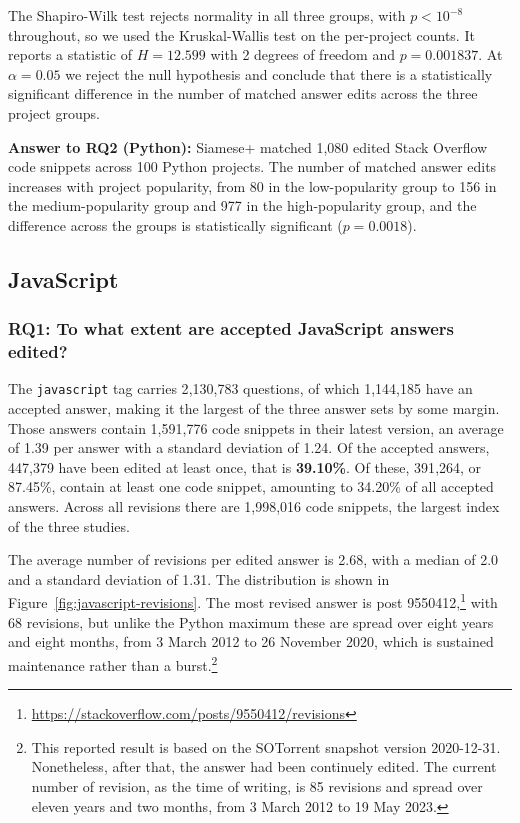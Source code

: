 \documentclass[onecolumn,11pt]{IEEEtran}
\newenvironment{rqanswer}{\par\medskip\begin{framed}\noindent}{\end{framed}\par\medskip}
\begin{document}
The Shapiro-Wilk test rejects normality in all three groups, with $p < 10^{-8}$ throughout, so we used the Kruskal-Wallis test on the per-project counts.
It reports a statistic of $H = 12.599$ with 2 degrees of freedom and $p = 0.001837$.
At $\alpha = 0.05$ we reject the null hypothesis and conclude that there is a statistically significant difference in the number of matched answer edits across the three project groups.

\begin{rqanswer}
\textbf{Answer to RQ2 (Python):} Siamese+ matched 1{,}080 edited Stack Overflow code snippets across 100 Python projects.
The number of matched answer edits increases with project popularity, from 80 in the low-popularity group to 156 in the medium-popularity group and 977 in the high-popularity group, and the difference across the groups is statistically significant ($p = 0.0018$).
\end{rqanswer}

\subsection{JavaScript}
\label{sec:results-javascript}

\subsubsection{RQ1: To what extent are accepted JavaScript answers edited?}

The \texttt{javascript} tag carries 2{,}130{,}783 questions, of which 1{,}144{,}185 have an accepted answer, making it the largest of the three answer sets by some margin.
Those answers contain 1{,}591{,}776 code snippets in their latest version, an average of 1.39 per answer with a standard deviation of 1.24.
Of the accepted answers, 447{,}379 have been edited at least once, that is \textbf{39.10\%}.
Of these, 391{,}264, or 87.45\%, contain at least one code snippet, amounting to 34.20\% of all accepted answers.
Across all revisions there are 1{,}998{,}016 code snippets, the largest index of the three studies.

The average number of revisions per edited answer is 2.68, with a median of 2.0 and a standard deviation of 1.31.
The distribution is shown in Figure~\ref{fig:javascript-revisions}.
The most revised answer is post 9550412,\footnote{\url{https://stackoverflow.com/posts/9550412/revisions}} with 68 revisions, but unlike the Python maximum these are spread over eight years and eight months, from 3 March 2012 to 26 November 2020, which is sustained maintenance rather than a burst.\footnote{This reported result is based on the SOTorrent snapshot version 2020-12-31. Nonetheless, after that, the answer had been continuely edited. The current number of revision, as the time of writing, is 85 revisions and spread over eleven years and two months, from 3 March 2012 to 19 May 2023.}
\end{document}
